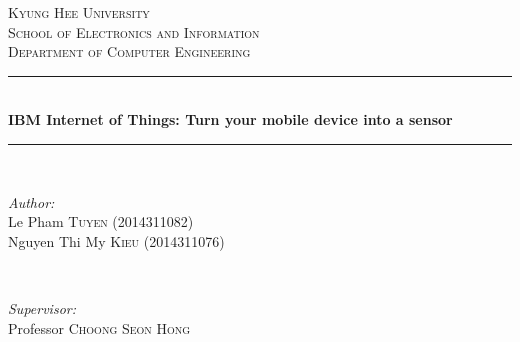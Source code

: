 \begin{titlepage}

\newcommand{\HRule}{\rule{\linewidth}{0.5mm}} %

\center %
 

\textsc{\LARGE Kyung Hee University}\\[1.5cm] %
\textsc{\Large School of Electronics and Information}\\[0.5cm] %
\textsc{\large Department of Computer Engineering}\\[0.5cm] %


\HRule \\[0.4cm]
{ \huge \bfseries IBM Internet of Things: Turn your mobile device into a sensor}\\[0.4cm] %
\HRule \\[1.5cm]
 

\begin{minipage}{0.45\textwidth}
\begin{flushleft} \large
\emph{Author:}\\
Le Pham \textsc{Tuyen} (2014311082) \\
Nguyen Thi My \textsc{Kieu} (2014311076)
\end{flushleft}
\end{minipage}
~
\begin{minipage}{0.45\textwidth}
\begin{flushright} \large
\emph{Supervisor:} \\
Professor \textsc{Choong Seon Hong} %
\end{flushright}
\end{minipage}\\[2cm]


\end{titlepage}
